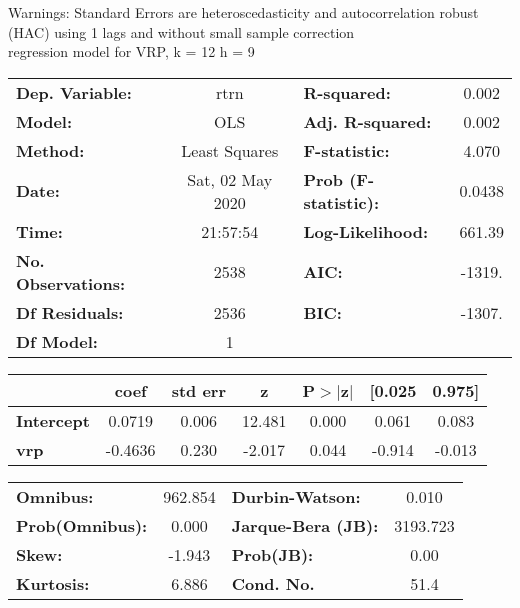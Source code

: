 Warnings: \newline
 [1] Standard Errors are heteroscedasticity and autocorrelation robust (HAC) using 1 lags and without small sample correction\\ 

regression model for VRP, k = 12 h = 9\begin{center}
\begin{tabular}{lclc}
\toprule
\textbf{Dep. Variable:}    &       rtrn       & \textbf{  R-squared:         } &     0.002   \\
\textbf{Model:}            &       OLS        & \textbf{  Adj. R-squared:    } &     0.002   \\
\textbf{Method:}           &  Least Squares   & \textbf{  F-statistic:       } &     4.070   \\
\textbf{Date:}             & Sat, 02 May 2020 & \textbf{  Prob (F-statistic):} &   0.0438    \\
\textbf{Time:}             &     21:57:54     & \textbf{  Log-Likelihood:    } &    661.39   \\
\textbf{No. Observations:} &        2538      & \textbf{  AIC:               } &    -1319.   \\
\textbf{Df Residuals:}     &        2536      & \textbf{  BIC:               } &    -1307.   \\
\textbf{Df Model:}         &           1      & \textbf{                     } &             \\
\bottomrule
\end{tabular}
\begin{tabular}{lcccccc}
                   & \textbf{coef} & \textbf{std err} & \textbf{z} & \textbf{P$> |$z$|$} & \textbf{[0.025} & \textbf{0.975]}  \\
\midrule
\textbf{Intercept} &       0.0719  &        0.006     &    12.481  &         0.000        &        0.061    &        0.083     \\
\textbf{vrp}       &      -0.4636  &        0.230     &    -2.017  &         0.044        &       -0.914    &       -0.013     \\
\bottomrule
\end{tabular}
\begin{tabular}{lclc}
\textbf{Omnibus:}       & 962.854 & \textbf{  Durbin-Watson:     } &    0.010  \\
\textbf{Prob(Omnibus):} &   0.000 & \textbf{  Jarque-Bera (JB):  } & 3193.723  \\
\textbf{Skew:}          &  -1.943 & \textbf{  Prob(JB):          } &     0.00  \\
\textbf{Kurtosis:}      &   6.886 & \textbf{  Cond. No.          } &     51.4  \\
\bottomrule
\end{tabular}
\end{center}

